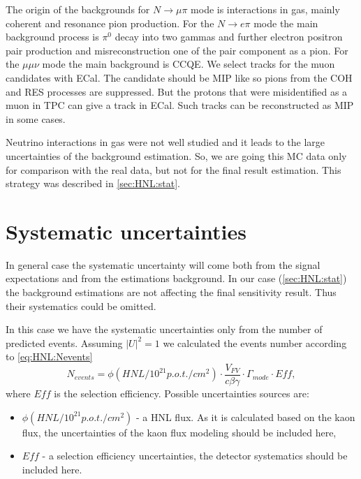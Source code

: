 \documentclass[../main.tex]{subfiles}
\begin{document}
The origin of the backgrounds for $N\to\mu\pi$ mode is interactions in gas, mainly coherent and resonance pion production. For the $N\to e\pi$ mode the main background process is $\pi^0$ decay into two gammas and further electron positron pair production and misreconstruction one of the pair component as a pion. For the $\mu\mu\nu$ mode the main background is CCQE. We select tracks for the muon candidates with ECal. The candidate should be MIP like so pions from the COH and RES processes are suppressed. But the protons that were misidentified as a muon in TPC can give a track in ECal. Such tracks can be reconstructed as MIP in some cases.

Neutrino interactions in gas were not well studied and it leads to the large uncertainties of the background estimation. So, we are going this MC data only for comparison with the real data, but not for the final result estimation. This strategy was described in \autoref{sec:HNL:stat}.

\section{Systematic uncertainties}
\label{sec:HNL:sys}
In general case the systematic uncertainty will come both from the signal expectations and from the estimations background. In our case (\autoref{sec:HNL:stat}) the background estimations are not affecting the final sensitivity result. Thus their systematics could be omitted.

In this case we have the systematic uncertainties only from the number of predicted events. Assuming $\left|U\right|^2=1$ we calculated the events number according to \autoref{eq:HNL:Nevents}
\begin{equation}
  N_{events}=\phi(HNL/10^{21}p.o.t./cm^2)\cdot\frac{V_{FV}}{c\beta\gamma}\cdot\Gamma_{mode}\cdot Eff,
\end{equation}
where $Eff$ is the selection efficiency. Possible uncertainties sources are:
\begin{itemize}
  \item $\phi(HNL/10^{21}p.o.t./cm^2)$ - a HNL flux. As it is calculated based on the kaon flux, the uncertainties of the kaon flux modeling should be included here,
  \item $Eff$ - a selection efficiency uncertainties, the detector systematics should be included here.
\end{itemize}
\end{document}
